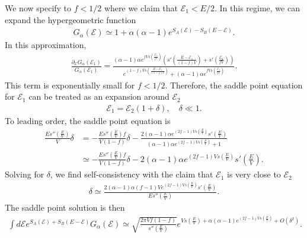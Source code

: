 \documentclass[a4paper,11pt]{article}
\begin{document}
We now specify to $f < 1/2$ where we claim that $\mathcal{E}_1 < E/2$. In this regime, we can expand the hypergeometric function
\begin{align}
    G_{\alpha}(\mathcal{E}) \simeq 1 + \alpha(\alpha-1)e^{S_A(\mathcal{E})- S_B(E-\mathcal{E})}.
\end{align}
In this approximation,
\begin{align}
    \frac{\partial_{\mathcal{E}}G_{\alpha}(\mathcal{E}_1)}{G_{\alpha}(\mathcal{E}_1)} = \frac{(\alpha -1) \alpha  e^{f V s\left(\frac{\mathcal{E}_1}{f V}\right)}
   \left(s'\left(\frac{E-\mathcal{E}_1}{(1-f) V}\right)+s'\left(\frac{\mathcal{E}_1}{f
   V}\right)\right)}{e^{(1-f) V s\left(\frac{E-\mathcal{E}_1}{(1-f)
   V}\right)}+(\alpha -1) \alpha  e^{f V s\left(\frac{\mathcal{E}_1}{f V}\right)}}.
\end{align}
This term is exponentially small for $f < 1/2$. Therefore, the saddle point equation for $\mathcal{E}_1$ can be treated as an expansion around $\mathcal{E}_2$
\begin{align}
    \mathcal{E}_1 = \mathcal{E}_2(1+\delta), \quad \delta \ll 1.
\end{align}
To leading order, the saddle point equation is 
\begin{align}
    \frac{E s''\left(\frac{E}{V}\right)}{V}\delta &= -\frac{E s''\left(\frac{E}{V}\right)f}{V(1-f)}\delta -\frac{2 (\alpha -1) \alpha  e^{(2 f-1) V s\left(\frac{E}{V}\right)}
   s'\left(\frac{E}{V}\right)}{(\alpha -1) \alpha  e^{(2 f-1) V
   s\left(\frac{E}{V}\right)}+1}
   \nonumber
   \\
   &\simeq 
   -\frac{E s''\left(\frac{E}{V}\right)f}{V(1-f)}\delta -{2 (\alpha -1) \alpha  e^{(2 f-1) V s\left(\frac{E}{V}\right)}
   s'\left(\frac{E}{V}\right)}.
\end{align}
Solving for $\delta$, we find self-consistency with the claim that $\mathcal{E}_1$ is very close to $\mathcal{E}_2$
\begin{align}
    \delta \simeq \frac{2 (\alpha -1) \alpha  (f-1) V e^{(2 f-1) V
   s\left(\frac{E}{V}\right)} s'\left(\frac{E}{V}\right)}{E
   s''\left(\frac{E}{V}\right)}.
\end{align}
The saddle point solution is then
\begin{align}
     \int d\mathcal{E}e^{S_A(\mathcal{E})+S_B(E-\mathcal{E})}G_{\alpha}(\mathcal{E}) \simeq \sqrt{ \frac{2\pi V f(1-f)}{s''\left( \frac{E}{V}\right)}} e^{Vs\left(\frac{E}{V}\right)+\alpha(\alpha -1)e^{(2 f-1) V s\left(\frac{E}{V}\right)}+ O(\delta^2)}.
\end{align}
\end{document}
